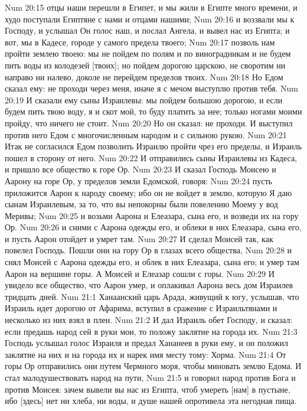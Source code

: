 Num 20:15  отцы наши перешли в Египет, и мы жили в Египте много времени, и худо поступали Египтяне с нами и отцами нашими;
Num 20:16  и воззвали мы к Господу, и услышал Он голос наш, и послал Ангела, и вывел нас из Египта; и вот, мы в Кадесе, городе у самого предела твоего;
Num 20:17  позволь нам пройти землею твоею: мы не пойдем по полям и по виноградникам и не будем пить воды из колодезей [твоих]; но пойдем дорогою царскою, не своротим ни направо ни налево, доколе не перейдем пределов твоих.
Num 20:18  Но Едом сказал ему: не проходи через меня, иначе я с мечом выступлю против тебя.
Num 20:19  И сказали ему сыны Израилевы: мы пойдем большою дорогою, и если будем пить твою воду, я и скот мой, то буду платить за нее; только ногами моими пройду, что ничего не стоит.
Num 20:20  Но он сказал: не проходи. И выступил против него Едом с многочисленным народом и с сильною рукою.
Num 20:21  Итак не согласился Едом позволить Израилю пройти чрез его пределы, и Израиль пошел в сторону от него.
Num 20:22  И отправились сыны Израилевы из Кадеса, и пришло все общество к горе Ор.
Num 20:23  И сказал Господь Моисею и Аарону на горе Ор, у пределов земли Едомской, говоря:
Num 20:24  пусть приложится Аарон к народу своему; ибо он не войдет в землю, которую Я даю сынам Израилевым, за то, что вы непокорны были повелению Моему у вод Меривы;
Num 20:25  и возьми Аарона и Елеазара, сына его, и возведи их на гору Ор.
Num 20:26  и сними с Аарона одежды его, и облеки в них Елеазара, сына его, и пусть Аарон отойдет и умрет там.
Num 20:27  И сделал Моисей так, как повелел Господь. Пошли они на гору Ор в глазах всего общества,
Num 20:28  и снял Моисей с Аарона одежды его, и облек в них Елеазара, сына его; и умер там Аарон на вершине горы. А Моисей и Елеазар сошли с горы.
Num 20:29  И увидело все общество, что Аарон умер, и оплакивал Аарона весь дом Израилев тридцать дней.
Num 21:1  Ханаанский царь Арада, живущий к югу, услышав, что Израиль идет дорогою от Афарима, вступил в сражение с Израильтянами и несколько из них взял в плен.
Num 21:2  И дал Израиль обет Господу, и сказал: если предашь народ сей в руки мои, то положу заклятие на города их.
Num 21:3  Господь услышал голос Израиля и предал Хананеев в руки ему, и он положил заклятие на них и на города их и нарек имя месту тому: Хорма.
Num 21:4  От горы Ор отправились они путем Чермного моря, чтобы миновать землю Едома. И стал малодушествовать народ на пути,
Num 21:5  и говорил народ против Бога и против Моисея: зачем вывели вы нас из Египта, чтоб умереть [нам] в пустыне, ибо [здесь] нет ни хлеба, ни воды, и душе нашей опротивела эта негодная пища.
